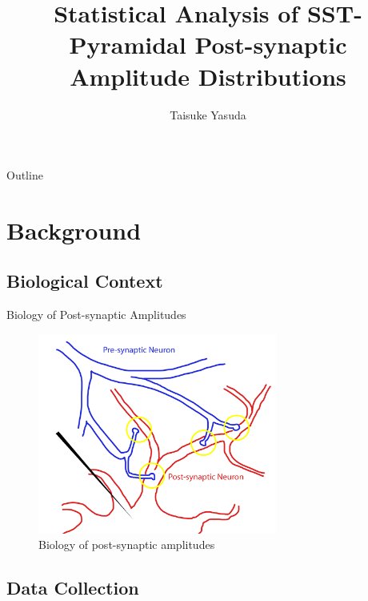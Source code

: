 \documentclass{beamer}
\title{Statistical Analysis of SST-Pyramidal Post-synaptic Amplitude Distributions}
\author{Taisuke Yasuda}
\begin{document}
\begin{frame}
  \titlepage
\end{frame}

\begin{frame}{Outline}
  \tableofcontents
\end{frame}


\section{Background}

\subsection{Biological Context}

\begin{frame}{Biology of Post-synaptic Amplitudes}
  \begin{figure}
    \centering
    \includegraphics[width = 0.7\textwidth]{./synapse-biology.png}
    \caption{Biology of post-synaptic amplitudes}
  \end{figure}
\end{frame}

\subsection{Data Collection}
\end{document}
